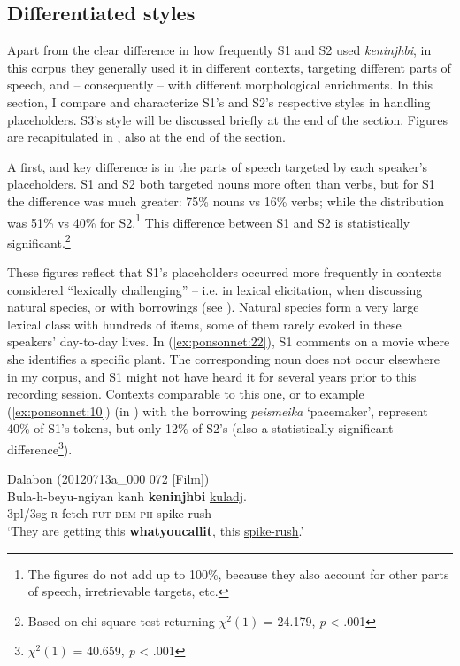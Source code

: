 \documentclass[output=paper]{langscibook}
\begin{document}
\subsection{Differentiated styles}
\label{sec:ponsonnet:4.2}

Apart from the clear difference in how frequently S1 and S2 used \textit{keninjhbi}, in this corpus they generally used it in different contexts, targeting different parts of speech, and – consequently – with different morphological enrichments. In this section, I compare and characterize S1’s and S2’s respective styles in handling placeholders. S3’s style will be discussed briefly at the end of the section. Figures are recapitulated in , also at the end of the section.

A first, and key difference is in the parts of speech targeted by each speaker’s placeholders. S1 and S2 both targeted nouns more often than verbs, but for S1 the difference was much greater: 75\% nouns vs 16\% verbs; while the distribution was 51\% vs 40\% for S2.\footnote{The figures do not add up to 100\%, because they also account for other parts of speech, irretrievable targets, etc.} This difference between S1 and S2 is statistically significant.\footnote{Based on chi-square test returning  $\chi^2 (1)$ = 24.179, \textit{p} < .001}

These figures reflect that S1’s placeholders occurred more frequently in contexts considered “lexically challenging” – i.e. in lexical elicitation, when discussing natural species, or with borrowings (see ). Natural species form a very large lexical class with hundreds of items, some of them rarely evoked in these speakers’ day-to-day lives. In (\ref{ex:ponsonnet:22}), S1 comments on a movie where she identifies a specific plant. The corresponding noun does not occur elsewhere in my corpus, and S1 might not have heard it for several years prior to this recording session. Contexts comparable to this one, or to example (\ref{ex:ponsonnet:10}) (in ) with the borrowing \textit{peismeika} ‘pacemaker’, represent 40\% of S1’s tokens, but only 12\% of S2’s (also a statistically significant difference\footnote{$\chi^2 (1)$ = 40.659, \textit{p} < .001}). 

\ea
{\label{ex:ponsonnet:22} Dalabon (20120713a\_000 072 [Film])}\\
\gll Bula-h-beyu-ngiyan  kanh   \textbf{keninjhbi}   \uline{kuladj}.\\
\textup{3pl/3sg-}\textsc{r}\textup{{}-fetch-}\textsc{fut} \textsc{dem} \textsc{ph} \textup{spike-rush}\\
\glt \textup{‘They are getting this} \textbf{\textup{whatyoucallit}}\textup{, this \uline{spike-rush}.’}\\
\z
\end{document}
